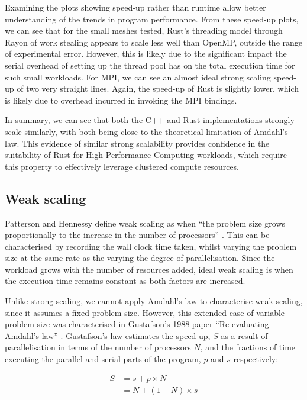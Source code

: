 Examining the plots showing speed-up rather than runtime allow better understanding of the trends in program performance. From these speed-up plots, we can see that for the small meshes tested, Rust's threading model through Rayon of work stealing appears to scale less well than OpenMP, outside the range of experimental error. However, this is likely due to the significant impact the serial overhead of setting up the thread pool has on the total execution time for such small workloads. For MPI, we can see an almost ideal strong scaling speed-up of two very straight lines. Again, the speed-up of Rust is slightly lower, which is likely due to overhead incurred in invoking the MPI bindings.

In summary, we can see that both the C++ and Rust implementations strongly scale similarly, with both being close to the theoretical limitation of Amdahl's law. This evidence of similar strong scalability provides confidence in the suitability of Rust for High-Performance Computing workloads, which require this property to effectively leverage clustered compute resources.

\subsection{Weak scaling}
\label{ssec:weak-scaling}

Patterson and Hennessy define weak scaling as when ``the problem size grows proportionally to the increase in the number of processors'' \cite{pattersonHennessyComputerOrganisationArchitecture}. This can be characterised by recording the wall clock time taken, whilst varying the problem size at the same rate as the varying the degree of parallelisation. Since the workload grows with the number of resources added, ideal weak scaling is when the execution time remains constant as both factors are increased.

Unlike strong scaling, we cannot apply Amdahl's law to characterise weak scaling, since it assumes a fixed problem size. However, this extended case of variable problem size was characterised in Gustafson's 1988 paper ``Re-evaluating Amdahl's law'' \cite{gustafsonReevaluatingAmdahlLaw1988}. Gustafson's law estimates the speed-up, $S$ as a result of parallelisation in terms of the number of processors $N$, and the fractions of time executing the parallel and serial parts of the program, $p$ and $s$ respectively:

\begin{align}
    S &= s + p \times N \\
      &= N + (1 - N) \times s
\end{align}

